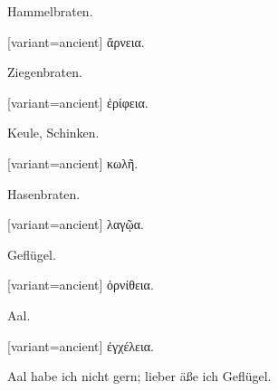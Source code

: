 Hammelbraten. 

\egroup\switchcolumn\bgroup

\begin{greek}[variant=ancient]%
ἄρνεια.

\end{greek}%
\egroup\myafterpagefalse\switchcolumn*\bgroup

Ziegenbraten. 

\egroup\switchcolumn\bgroup

\begin{greek}[variant=ancient]%
ἐρίφεια.

\end{greek}%
\egroup\myafterpagefalse\switchcolumn*\bgroup

Keule, Schinken. 

\egroup\switchcolumn\bgroup

\begin{greek}[variant=ancient]%
κωλῆ.

\end{greek}%
\egroup\myafterpagefalse\switchcolumn*\bgroup

Hasenbraten. 

\egroup\switchcolumn\bgroup

\begin{greek}[variant=ancient]%
λαγῷα.

\end{greek}%
\egroup\myafterpagefalse\switchcolumn*\bgroup

Geflügel. 

\egroup\switchcolumn\bgroup

\begin{greek}[variant=ancient]%
ὀρνίθεια.

\end{greek}%
\egroup\myafterpagefalse\switchcolumn*\bgroup

Aal. 

\egroup\switchcolumn\bgroup

\begin{greek}[variant=ancient]%
ἐγχέλεια.

\end{greek}%
\egroup\switchcolumn*

Aal habe ich nicht gern; lieber äße ich Geflügel.

